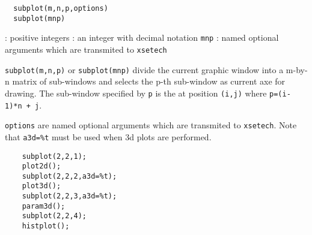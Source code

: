 \begin{mandesc}
\end{mandesc}
\begin{calling_sequence}
\begin{verbatim}
  subplot(m,n,p,options)
  subplot(mnp)
\end{verbatim}
\end{calling_sequence}
\begin{parameters}
  \begin{varlist}
    : positive integers
    : an integer with decimal notation \verb!mnp!
    : named optional arguments which are transmited to \verb!xsetech!
  \end{varlist}
\end{parameters}

\begin{mandescription}
  \verb!subplot(m,n,p)! or \verb!subplot(mnp)! divide the
  current graphic window into a m-by-n matrix of sub-windows and selects the
  p-th sub-window as current axe for drawing.
  The sub-window specified by \verb!p! is the at position \verb!(i,j)! where
  \verb!p=(i-1)*n + j!.

  \verb!options! are named optional arguments which are transmited to \verb!xsetech!.
  Note that \verb!a3d=%t! must be used when 3d plots are performed.
\end{mandescription}

\begin{examples}
  \begin{Verbatim}
    subplot(2,2,1);
    plot2d();
    subplot(2,2,2,a3d=%t);
    plot3d();
    subplot(2,2,3,a3d=%t);
    param3d();
    subplot(2,2,4);
    histplot();
  \end{Verbatim}
\end{examples}
